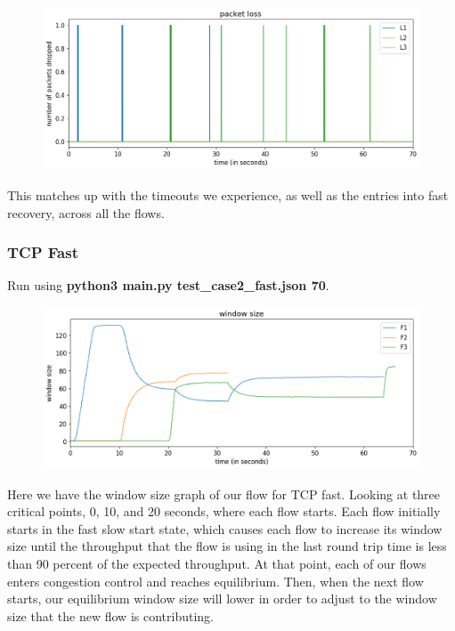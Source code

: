 \documentclass{article}
\begin{document}
\begin{figure}[H]
\centering
\includegraphics[width = \textwidth]{test_case2_reno packet loss.png}
\end{figure}

This matches up with the timeouts we experience, as well as the entries into fast recovery, across all the flows.

\subsubsection{TCP Fast}

Run using \textbf{python3 main.py test\_case2\_fast.json 70}.

\begin{figure}[H]
\centering
\includegraphics[width = \textwidth]{test_case2_fast window size.png}
\end{figure}

Here we have the window size graph of our flow for TCP fast. Looking at three critical points, 0, 10, and 20 seconds, where each flow starts. Each flow initially starts in the fast slow start state, which causes each flow to increase its window size until the throughput that the flow is using in the last round trip time is less than 90 percent of the expected throughput. At that point, each of our flows enters congestion control and reaches equilibrium. Then, when the next flow starts, our equilibrium window size will lower in order to adjust to the window size that the new flow is contributing.
\end{document}
